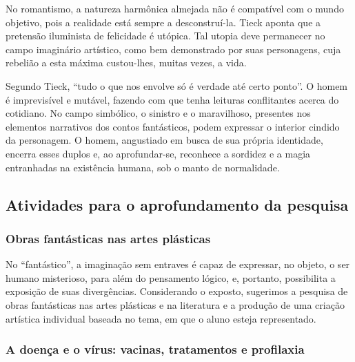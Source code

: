 \documentclass[12pt]{extarticle}
\begin{document}
No romantismo, a natureza harmônica almejada não é compatível com o
mundo objetivo, pois a realidade está sempre a desconstruí-la. Tieck
aponta que a pretensão iluminista de felicidade é utópica. Tal utopia
deve permanecer no campo imaginário artístico, como bem demonstrado por
suas personagens, cuja rebelião a esta máxima custou-lhes, muitas vezes,
a vida.

Segundo Tieck, ``tudo o que nos envolve só é verdade até certo ponto''.
O homem é imprevisível e mutável, fazendo com que tenha leituras
conflitantes acerca do cotidiano. No campo simbólico, o sinistro e o
maravilhoso, presentes nos elementos narrativos dos contos fantásticos,
podem expressar o interior cindido da personagem. O homem, angustiado em
busca de sua própria identidade, encerra esses duplos e, ao
aprofundar-se, reconhece a sordidez e a magia entranhadas na existência
humana, sob o manto de normalidade.

\subsection{Atividades para o aprofundamento da pesquisa}



\subsubsection{Obras fantásticas nas artes plásticas}

No ``fantástico'', a imaginação sem entraves é capaz de expressar, no
objeto, o ser humano misterioso, para além do pensamento lógico, e,
portanto, possibilita a exposição de suas divergências. Considerando o
exposto, sugerimos a pesquisa de obras fantásticas nas artes plásticas
e na literatura e a produção de uma criação artística individual
baseada no tema, em que o aluno esteja representado.

\subsubsection{A doença
e o vírus: vacinas, tratamentos e profilaxia}
\end{document}
